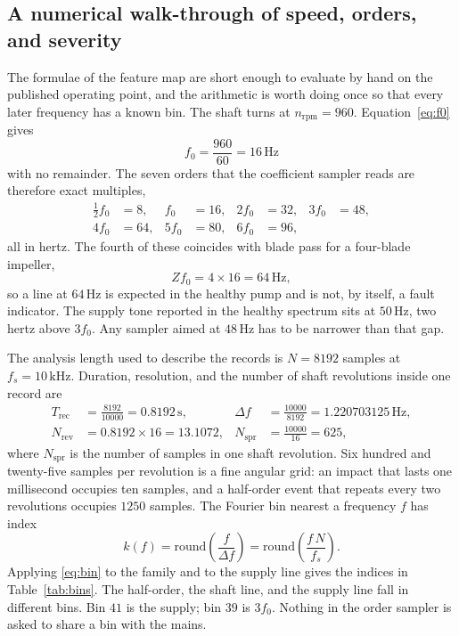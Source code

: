 \subsection{A numerical walk-through of speed, orders, and severity}
\label{sec:walkthrough}

The formulae of the feature map are short enough to evaluate by hand on the published operating point, and the arithmetic is worth doing once so that every later frequency has a known bin.
The shaft turns at \(n_{\mathrm{rpm}}=960\).
Equation~\eqref{eq:f0} gives
\begin{equation}
f_{0}=\frac{960}{60}=16\,\mathrm{Hz}
\label{eq:f0exact}
\end{equation}
with no remainder.
The seven orders that the coefficient sampler reads are therefore exact multiples,
\begin{equation}
\begin{aligned}
\tfrac12 f_{0}&=8,&
f_{0}&=16,&
2f_{0}&=32,&
3f_{0}&=48,\\
4f_{0}&=64,&
5f_{0}&=80,&
6f_{0}&=96,
\end{aligned}
\label{eq:ordersexact}
\end{equation}
all in hertz.
The fourth of these coincides with blade pass for a four-blade impeller,
\begin{equation}
Z f_{0}=4\times 16=64\,\mathrm{Hz},
\label{eq:bpexact}
\end{equation}
so a line at \(64\,\mathrm{Hz}\) is expected in the healthy pump and is not, by itself, a fault indicator.
The supply tone reported in the healthy spectrum sits at \(50\,\mathrm{Hz}\), two hertz above \(3f_{0}\).
Any sampler aimed at \(48\,\mathrm{Hz}\) has to be narrower than that gap.

The analysis length used to describe the records is \(N=8192\) samples at \(f_{s}=10\,\mathrm{kHz}\).
Duration, resolution, and the number of shaft revolutions inside one record are
\begin{align}
T_{\mathrm{rec}}&=\frac{8192}{10000}=0.8192\,\mathrm{s},&
\Delta f&=\frac{10000}{8192}=1.220703125\,\mathrm{Hz},\\
N_{\mathrm{rev}}&=0.8192\times 16=13.1072,&
N_{\mathrm{spr}}&=\frac{10000}{16}=625,
\label{eq:arith2}
\end{align}
where \(N_{\mathrm{spr}}\) is the number of samples in one shaft revolution.
Six hundred and twenty-five samples per revolution is a fine angular grid: an impact that lasts one millisecond occupies ten samples, and a half-order event that repeats every two revolutions occupies \(1250\) samples.
The Fourier bin nearest a frequency \(f\) has index
\begin{equation}
k(f)=\mathrm{round}\!\left(\frac{f}{\Delta f}\right)
=\mathrm{round}\!\left(\frac{f\,N}{f_{s}}\right).
\label{eq:bin}
\end{equation}
Applying \eqref{eq:bin} to the family and to the supply line gives the indices in Table~\ref{tab:bins}.
The half-order, the shaft line, and the supply line fall in different bins.
Bin \(41\) is the supply; bin \(39\) is \(3f_{0}\).
Nothing in the order sampler is asked to share a bin with the mains.

